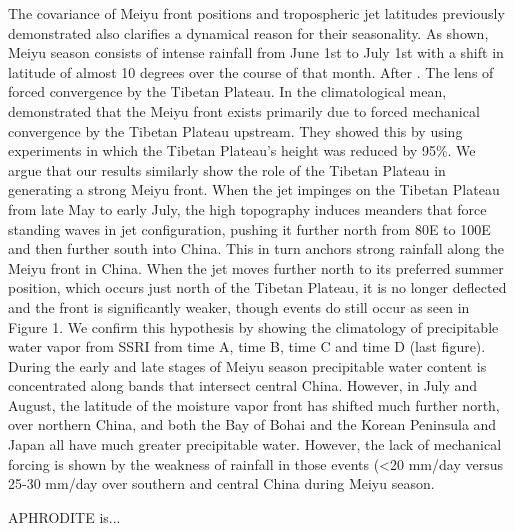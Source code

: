 \documentclass[draft,grl]{AGUTeX}
\begin{document}
\begin{article}
	The covariance of Meiyu front positions and tropospheric jet latitudes previously demonstrated also clarifies a dynamical reason for their seasonality. As shown, Meiyu season consists of intense rainfall from June 1st to July 1st with a shift in latitude of almost 10 degrees over the course of that month. After . The lens of forced convergence by the Tibetan Plateau. In the climatological mean, \cite{Chen2014} demonstrated that the Meiyu front exists primarily due to forced mechanical convergence by the Tibetan Plateau upstream. They showed this by using experiments in which the Tibetan Plateau's height was reduced by 95\%. We argue that our results similarly show the role of the Tibetan Plateau in generating a strong Meiyu front. When the jet impinges on the Tibetan Plateau from late May to early July, the high topography induces meanders that force standing waves in jet configuration, pushing it further north from 80E to 100E and then further south into China. This in turn anchors strong rainfall along the Meiyu front in China. When the jet moves further north to its preferred summer position, which occurs just north of the Tibetan Plateau, it is no longer deflected and the front is significantly weaker, though events do still occur as seen in Figure 1. We confirm this hypothesis by showing the climatology of precipitable water vapor from SSRI from time A, time B, time C and time D (last figure). During the early and late stages of Meiyu season precipitable water content is concentrated along bands that intersect central China. However, in July and August, the latitude of the moisture vapor front has shifted much further north, over northern China, and both the Bay of Bohai and the Korean Peninsula and Japan all have much greater precipitable water. However, the lack of mechanical forcing is shown by the weakness of rainfall in those events (\textless 20 mm/day versus 25-30 mm/day over southern and central China during Meiyu season.


\begin{acknowledgments}
APHRODITE is... 
\end{acknowledgments}


\end{article}
\end{document}
